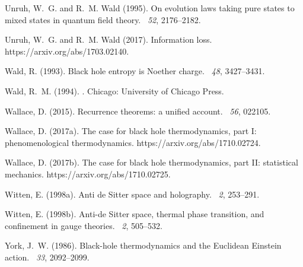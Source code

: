 \documentclass{article}
\begin{document}
\begin{thebibliography}{}
Unruh, W.~G. and R.~M. Wald (1995).
\newblock On evolution laws taking pure states to mixed states in quantum field
  theory.
~{\em 52}, 2176--2182.

Unruh, W.~G. and R.~M. Wald (2017).
\newblock Information loss.
\newblock https://arxiv.org/abs/1703.02140.

Wald, R. (1993).
\newblock Black hole entropy is {N}oether charge.
~{\em 48}, 3427--3431.

Wald, R.~M. (1994).
.
\newblock Chicago: University of Chicago Press.

Wallace, D. (2015).
\newblock Recurrence theorems: a unified account.
~{\em 56}, 022105.

Wallace, D. (2017a).
\newblock The case for black hole thermodynamics, part {I}: phenomenological
  thermodynamics.
\newblock https://arxiv.org/abs/1710.02724.

Wallace, D. (2017b).
\newblock The case for black hole thermodynamics, part {II}: statistical
  mechanics.
\newblock https://arxiv.org/abs/1710.02725.

Witten, E. (1998a).
\newblock Anti de {S}itter space and holography.
~{\em 2},
  253--291.

Witten, E. (1998b).
\newblock Anti-de {S}itter space, thermal phase transition, and confinement in
  gauge theories.
~{\em 2},
  505--532.

York, J.~W. (1986).
\newblock Black-hole thermodynamics and the {E}uclidean {E}instein action.
~{\em 33}, 2092--2099.

\end{thebibliography}
\end{document}
